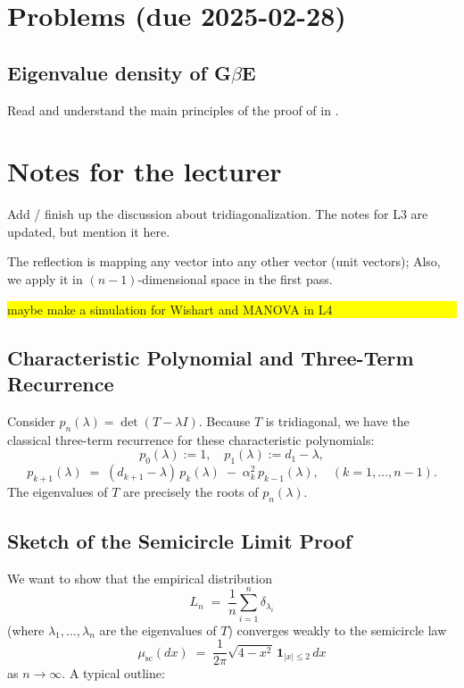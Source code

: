 \documentclass[letterpaper,11pt,oneside,reqno]{article}
\numberwithin{equation}{section}
\theoremstyle{definition}
\newenvironment{lnotes}{\section*{Notes for the lecturer}}{}
\begin{document}
\appendix
\setcounter{section}{3}

\section{Problems (due 2025-02-28)}

\subsection{Eigenvalue density of G$\beta$E}

Read and understand the main principles of the 
proof of 
in \cite{dumitriu2002matrix}.






\begin{lnotes}

	Add / finish up the discussion about tridiagonalization. The notes for L3 are updated, but
	mention it here.

	The reflection is mapping any vector into any other vector (unit vectors);
	Also, we apply it in $(n-1)$-dimensional space in the first pass.


\colorbox{yellow}{\parbox{.7\textwidth}{maybe make a simulation for Wishart and MANOVA in L4}}


\subsection{Characteristic Polynomial and Three-Term Recurrence}

Consider \(p_n(\lambda) = \det(T - \lambda I)\).  Because \(T\) is tridiagonal, we have the classical three-term recurrence for these characteristic polynomials:
\[
  p_0(\lambda) := 1,\quad
  p_1(\lambda) := d_1 - \lambda,
\]
\[
  p_{k+1}(\lambda)
  \;=\;
  (d_{k+1} - \lambda)\,p_k(\lambda)
  \;-\;\alpha_k^2\,p_{k-1}(\lambda),
  \quad
  (k=1,\dots,n-1).
\]
The eigenvalues of \(T\) are precisely the roots of \(p_n(\lambda)\).

\subsection{Sketch of the Semicircle Limit Proof}

We want to show that the empirical distribution
\[
  L_n
  \;=\;
  \frac{1}{n}\sum_{i=1}^n \delta_{\lambda_i}
\]
(where \(\lambda_1,\dots,\lambda_n\) are the eigenvalues of \(T\)) converges weakly to the semicircle law
\[
  \mu_{\mathrm{sc}}(dx)
  \;=\;
  \frac{1}{2\pi}\sqrt{4 - x^2}\,\mathbf{1}_{|x|\le 2}\,dx
\]
as \(n\to\infty\).  A typical outline:


\end{lnotes}
\end{document}
